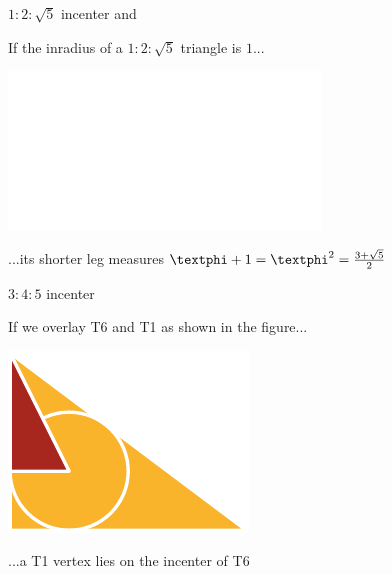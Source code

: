 \documentclass[14pt]{beamer}
\begin{document}

    \begin{frame}{$1\!\!:\!\!2\!\!:\!\!\sqrt{5}$ incenter and \textphi}
        \begin{center}
            If the inradius of a $1\!\!:\!\!2\!\!:\!\!\sqrt{5}$ triangle is $1$...

            \bigskip \bigskip

            \includegraphics[height=18ex]{figures/figure006a.pdf}

            \bigskip \bigskip

            ...its shorter leg measures $\text{\textphi}+1 = \text{\textphi}^2 = \frac{3+\sqrt{5}}{2}$
        \end{center}
    \end{frame}


    \begin{frame}{$3\!\!:\!\!4\!\!:\!\!5$ incenter}
        \begin{center}
            If we overlay T6 and T1 as shown in the figure...

            \bigskip \bigskip

            \includegraphics[height=18ex]{figures/figure006b.pdf}

            \bigskip \bigskip

            ...a T1 vertex lies on the incenter of T6
        \end{center}
    \end{frame}

\end{document}
